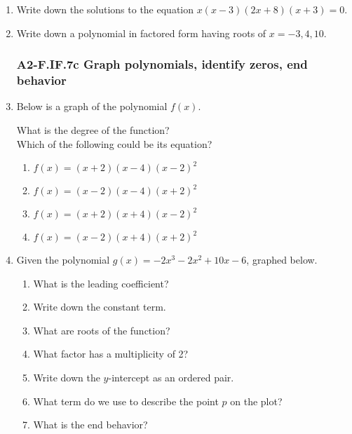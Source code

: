 \documentclass[12pt, twoside]{article}
\begin{document}
\begin{enumerate}
\item Write down the solutions to the equation $x(x-3)(2x+8)(x+3)=0$. \vspace{0.5cm}

\item Write down a polynomial in factored form having roots of $x = -3, 4, 10$.

\newpage
\subsubsection*{A2-F.IF.7c Graph polynomials, identify zeros, end behavior}
\item Below is a graph of the polynomial $f(x)$. 
\begin{multicols}{2}
    What is the degree of the function?\\[1.5cm]
    Which of the following could be its equation?
    \begin{enumerate}
        \item $f(x)=(x+2)(x-4)(x-2)^2$
        \item $f(x)=(x-2)(x-4)(x+2)^2$
        \item $f(x)=(x+2)(x+4)(x-2)^2$
        \item $f(x)=(x-2)(x+4)(x+2)^2$
    \end{enumerate} \vspace{1cm} \;

    \columnbreak
\end{multicols}

\item Given the polynomial $g(x)=-2x^3-2x^2+10x-6$, graphed below. 
\begin{multicols}{2}
    \begin{enumerate}[itemsep=0.5cm]
        \item What is the leading coefficient?
        \item Write down the constant term.
        \item What are roots of the function?
        \item What factor has a multiplicity of 2?
        \item Write down the $y$-intercept as an ordered pair.
        \item What term do we use to describe the point $p$ on the plot?
        \item What is the end behavior?
    \end{enumerate} \vspace{1cm} \;


\end{multicols}
\end{enumerate}
\end{document}
